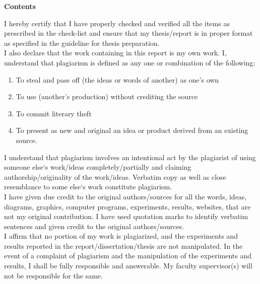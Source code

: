 \documentclass[12pt]{article}
\newlength{\defbaselineskip}
\newcommand{\setlinespacing}[1]%
{\setlength{\baselineskip}{#1 \defbaselineskip}}
\begin{document}
\begin{titlepage}
		\end{titlepage}
		\iffalse
		\newpage
		\setcounter{page}{1}
		\setlinespacing{1}
		\begin{center}
			{\large \bf Contents}
		\end{center}
		I hereby certify that I have properly checked and verified all the items as prescribed in the check-list and ensure that my thesis/report is in proper format as specified in the guideline for thesis preparation. \\
		
		\noindent I also declare that the work containing in this report is my own work. I, understand that plagiarism is defined as any one or combination of the following:
		\begin{enumerate}
			\item To steal and pass off (the ideas or words of another) as one's own
			\item To use (another's production) without crediting the source
			\item To commit literary theft
			\item To present as new and original an idea or product derived from an existing source.
		\end{enumerate}
		I understand that plagiarism involves an intentional act by the plagiarist of using someone else`s work/ideas completely/partially and claiming authorship/originality of the work/ideas. Verbatim copy as well as close resemblance to some else`s work constitute plagiarism.\\
		
		\noindent I have given due credit to the original authors/sources for all the words, ideas, diagrams, graphics, computer programs, experiments, results, websites, that are not my original contribution. I have used quotation marks to identify verbatim sentences and given credit to the original authors/sources.\\
		
		\noindent I affirm that no portion of my work is plagiarized, and the experiments and results reported in the report/dissertation/thesis are not manipulated. In the event of a complaint of plagiarism and the manipulation of the experiments and results, I shall be fully responsible and answerable. My faculty supervisor(s) will not be responsible for the same.\vspace{1cm}\\
		
\end{document}
